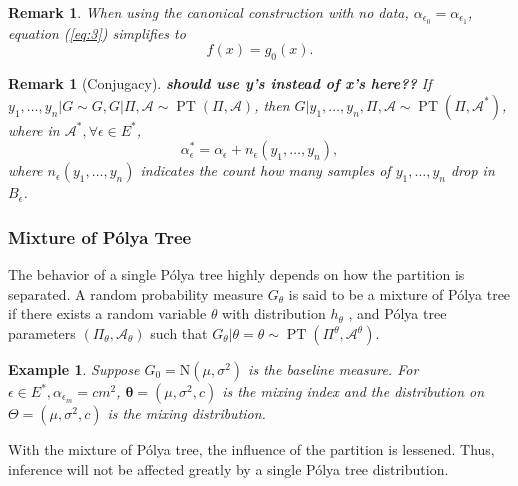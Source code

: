 \documentclass[12pt]{article}
\newtheorem{rmk}[thm]{Remark}
\newtheorem{emp}[thm]{Example}
\newcommand{\polya}{P\'{o}lya}
\DeclareMathOperator{\pt}{PT}
\begin{document}
\begin{rmk}
  When using the canonical construction with no data,
  $\alpha_{\epsilon_0 } = \alpha_{\epsilon_1}$, equation (\ref{eq:3})
  simplifies to
  \begin{displaymath}
    f(x) = g_0(x).
  \end{displaymath}
\end{rmk}

\begin{rmk}[Conjugacy]
{\bf should use y's instead of x's here??}  If $y_1, \ldots, y_n | G \sim G, G|\Pi, \mathcal{A} \sim \pt (\Pi,
  \mathcal{A})$, then $G|y_1, \ldots, y_n , \Pi, \mathcal{A} \sim \pt
  (\Pi, \mathcal{A}^{*})$, where in $\mathcal{A}^{*}, \forall \epsilon
  \in E^{*}$,
  \begin{displaymath}
    \alpha_{\epsilon}^{*} = \alpha_{\epsilon} + n_{\epsilon}(y_1, \ldots, y_n),
  \end{displaymath}
  where $n_{\epsilon}(y_1, \ldots, y_n)$ indicates the count how many
  samples of $y_1, \ldots, y_n$ drop in $B_{\epsilon}$.
\end{rmk}

\subsubsection{Mixture of \polya{} Tree}
The behavior of a single \polya{} tree highly depends on how the
partition is separated. A random probability measure $G_\theta$ is
said to be a mixture of \polya{} tree if there exists a random
variable $\theta$ with distribution $h_{\theta}$ , and \polya{} tree
parameters $(\Pi_{\theta}, \mathcal{A}_{\theta})$ such that
$G_{\theta} | \theta=\theta \sim \pt (\Pi^{\theta},
\mathcal{A}^{\theta})$.

\begin{emp}
  Suppose $G_0 = \mathrm{N}(\mu, \sigma^2)$ is the baseline measure.
  For $\epsilon \in E^{*}, \alpha_{\epsilon_m} = cm^2 $,
  $\bm{\theta}= (\mu, \sigma^2, c)$ is the mixing index and the
  distribution on $\Theta = (\mu, \sigma^2, c) $ is the mixing
  distribution.
\end{emp}
With the mixture of \polya{} tree, the influence of the partition
is lessened. Thus, inference will not be affected greatly by a single
\polya{} tree distribution.
\end{document}
